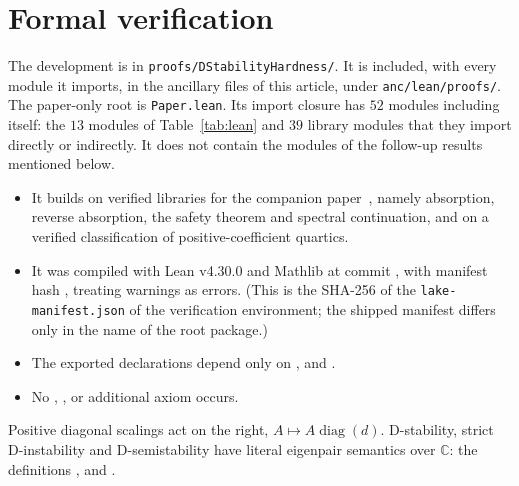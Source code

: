 \documentclass[11pt,a4paper]{article}
\theoremstyle{plain}
\theoremstyle{definition}
\theoremstyle{remark}
\newcommand{\C}{\mathbb{C}}
\newcommand{\diag}{\operatorname{diag}}
\begin{document}
\section{Formal verification}\label{sec:verification}

The development is in \texttt{proofs/DStabilityHardness/}. It is included, with every
module it imports, in the ancillary files of this article, under
\texttt{anc/lean/proofs/}. The paper-only root is \texttt{Paper.lean}. Its import closure
has $52$ modules including itself: the $13$ modules of Table~\ref{tab:lean} and $39$
library modules that they import directly or indirectly. It does not contain the modules
of the follow-up results mentioned below.
\begin{itemize}
\item It builds on verified libraries for the companion paper~\cite{companion2026},
namely absorption, reverse absorption, the safety theorem and spectral continuation,
and on a verified classification of positive-coefficient quartics.
\item It was compiled with Lean v4.30.0 and Mathlib at commit , with
manifest hash , treating warnings as errors. (This is the SHA-256
of the \texttt{lake-manifest.json} of the verification environment; the shipped manifest
differs only in the name of the root package.)
\item The exported declarations depend only on , 
and .
\item No , ,  or additional axiom occurs.
\end{itemize}
Positive diagonal scalings act on the right, $A\mapsto A\diag(d)$. D-stability, strict
D-instability and D-semistability have literal eigenpair semantics over $\C$: the
definitions ,  and .
\end{document}
